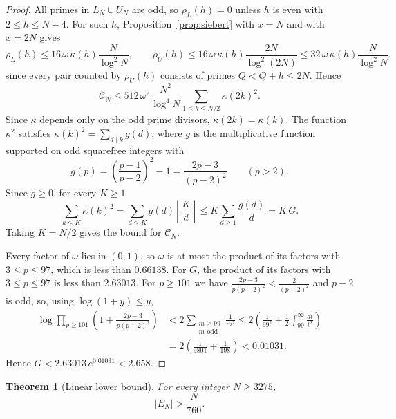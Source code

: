 \documentclass[11pt]{amsart}
\newtheorem{Theorem}{Theorem}[section]
\theoremstyle{definition}
\theoremstyle{remark}
\begin{document}
\begin{proof}
All primes in $L_N\cup U_N$ are odd, so $\rho_L(h)=0$ unless $h$ is even with $2\leq h\leq N-4$. For such $h$, Proposition~\ref{prop:siebert} with $x=N$ and with $x=2N$ gives
\[
\rho_L(h)\leq 16\,\omega\,\kappa(h)\frac{N}{\log^2 N},\qquad
\rho_U(h)\leq 16\,\omega\,\kappa(h)\frac{2N}{\log^2 (2N)}\leq 32\,\omega\,\kappa(h)\frac{N}{\log^2 N},
\]
since every pair counted by $\rho_U(h)$ consists of primes $Q<Q+h\leq 2N$. Hence
\[
\mathcal C_N\leq 512\,\omega^2\frac{N^2}{\log^4 N}\sum_{1\leq k\leq N/2}\kappa(2k)^2.
\]
Since $\kappa$ depends only on the odd prime divisors, $\kappa(2k)=\kappa(k)$. The function $\kappa^2$ satisfies $\kappa(k)^2=\sum_{d\mid k}g(d)$, where $g$ is the multiplicative function supported on odd squarefree integers with
\[
g(p)=\left(\frac{p-1}{p-2}\right)^2-1=\frac{2p-3}{(p-2)^2}\qquad(p>2).
\]
Since $g\geq 0$, for every $K\geq 1$
\[
\sum_{k\leq K}\kappa(k)^2=\sum_{d\leq K}g(d)\left\lfloor\frac{K}{d}\right\rfloor\leq K\sum_{d\geq 1}\frac{g(d)}{d}=K\,G.
\]
Taking $K=N/2$ gives the bound for $\mathcal C_N$.

Every factor of $\omega$ lies in $(0,1)$, so $\omega$ is at most the product of its factors with $3\leq p\leq 97$, which is less than $0.66138$. For $G$, the product of its factors with $3\leq p\leq 97$ is less than $2.63013$. For $p\geq 101$ we have $\frac{2p-3}{p(p-2)^2}<\frac{2}{(p-2)^2}$ and $p-2$ is odd, so, using $\log(1+y)\leq y$,
\begin{align*}
\log\prod_{p\geq 101}\left(1+\frac{2p-3}{p(p-2)^2}\right)&<2\sum_{\substack{m\geq 99\\ m \text{ odd}}}\frac{1}{m^2}\leq 2\left(\frac{1}{99^2}+\frac{1}{2}\int_{99}^{\infty}\frac{dt}{t^2}\right)\\
&=2\left(\frac{1}{9801}+\frac{1}{198}\right)<0.01031.
\end{align*}
Hence $G<2.63013\,e^{0.01031}<2.658$.
\end{proof}
\begin{Theorem}[Linear lower bound]\label{thm:linear}
For every integer $N\geq 3275$,
\[
|E_N|>\frac{N}{760}.
\]
\end{Theorem}
\end{document}
